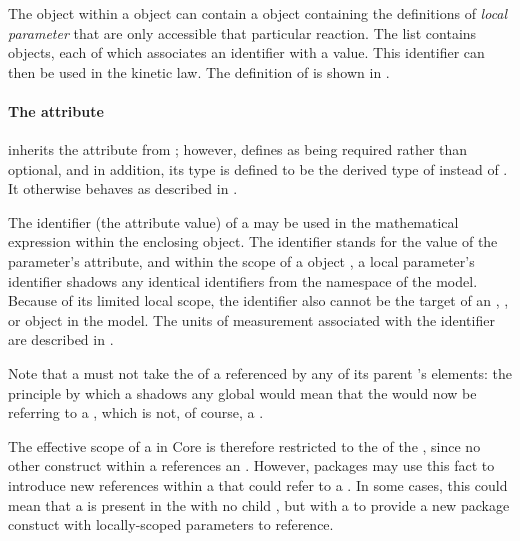 \subsubsection{}
\label{subsec:localparameter}

The \KineticLaw object within a \Reaction object can contain a
\ListOfLocalParameters object containing the definitions of
\emph{local parameter} that are only accessible 
that particular reaction.  The list contains
\LocalParameter objects, each of which associates an identifier
with a value.  This identifier can then be used in the kinetic
law.  The definition of \LocalParameter is shown in
.


\begin{blockChanged}
\paragraph{The  attribute}

\LocalParameter inherits the  attribute from \SBase; however, \LocalParameter defines  as being required rather than optional, and in addition, its type is defined to be the derived type of  instead of .  It otherwise behaves as described in .

The identifier (the  attribute value) of a \LocalParameter may be used in the mathematical expression within the enclosing \KineticLaw object.  The identifier stands for the value of the parameter's  attribute, and within the scope of a \KineticLaw object , a local parameter's identifier shadows any identical identifiers from the  namespace of the model.  Because of its limited local scope, the identifier also cannot be the target of an \InitialAssignment, \EventAssignment, or \Rule object in the model.  The units of measurement associated with the identifier are described in .

Note that a \LocalParameter must not take the  of a \Species referenced by any of its parent \Reaction's \SpeciesReference elements: the principle by which a \LocalParameter shadows any global  would mean that the \SpeciesReference would now be referring to a \LocalParameter, which is not, of course, a \Species.

The effective scope of a \LocalParameter {} in \sbmlthree Core is therefore restricted to the  of the \KineticLaw, since no other construct within a \Reaction references an .  However, \sbmlthree packages may use this fact to introduce new  references within a \Reaction that could refer to a \LocalParameter.  In some cases, this could mean that a \KineticLaw is present in the \Reaction with no child , but with a \ListOfLocalParameters to provide a new package constuct with locally-scoped parameters to reference.

\end{blockChanged}

